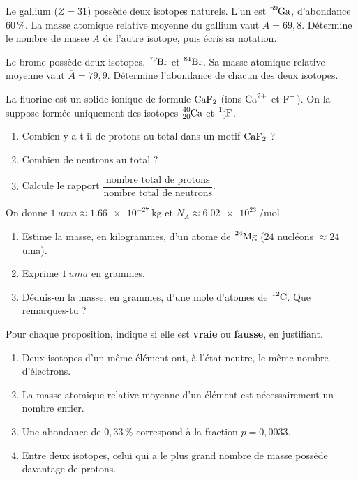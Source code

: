 \documentclass[11pt,a4paper]{article}
\begin{document}
\begin{exo}
Le gallium ($Z = 31$) possède deux isotopes naturels. L'un est $\ce{^{69}Ga}$, d'abondance $60\,\%$.
La masse atomique relative moyenne du gallium vaut $\overline{A} = 69{,}8$. Détermine le nombre de
masse $A$ de l'autre isotope, puis écris sa notation.
\end{exo}

\begin{exo}
Le brome possède deux isotopes, $\ce{^{79}Br}$ et $\ce{^{81}Br}$. Sa masse atomique relative moyenne
vaut $\overline{A} = 79{,}9$. Détermine l'abondance de chacun des deux isotopes.
\end{exo}

\begin{exo}
La fluorine est un solide ionique de formule $\ce{CaF2}$ (ions $\ce{Ca^{2+}}$ et $\ce{F^{-}}$). On la
suppose formée uniquement des isotopes $\ce{^{40}_{20}Ca}$ et $\ce{^{19}_{9}F}$.
\begin{enumerate}[label=\alph*)]
  \item Combien y a-t-il de protons au total dans un motif $\ce{CaF2}$ ?
  \item Combien de neutrons au total ?
  \item Calcule le rapport $\dfrac{\text{nombre total de protons}}{\text{nombre total de neutrons}}$.
\end{enumerate}
\end{exo}

\begin{exo}
On donne $\SI{1}{uma} \approx \SI{1,66e-27}{\kilo\gram}$ et $N_{\!A} \approx \SI{6,02e23}{\per\mole}$.
\begin{enumerate}[label=\alph*)]
  \item Estime la masse, en kilogrammes, d'un atome de $\ce{^{24}Mg}$ ($24$ nucléons $\approx 24$ uma).
  \item Exprime $\SI{1}{uma}$ en grammes.
  \item Déduis-en la masse, en grammes, d'une mole d'atomes de $\ce{^{12}C}$. Que remarques-tu ?
\end{enumerate}
\end{exo}

\begin{exo}
Pour chaque proposition, indique si elle est \textbf{vraie} ou \textbf{fausse}, en justifiant.
\begin{enumerate}[label=\alph*)]
  \item Deux isotopes d'un même élément ont, à l'état neutre, le même nombre d'électrons.
  \item La masse atomique relative moyenne d'un élément est nécessairement un nombre entier.
  \item Une abondance de $0{,}33\,\%$ correspond à la fraction $p = 0{,}0033$.
  \item Entre deux isotopes, celui qui a le plus grand nombre de masse possède davantage de protons.
\end{enumerate}
\end{exo}
\end{document}
